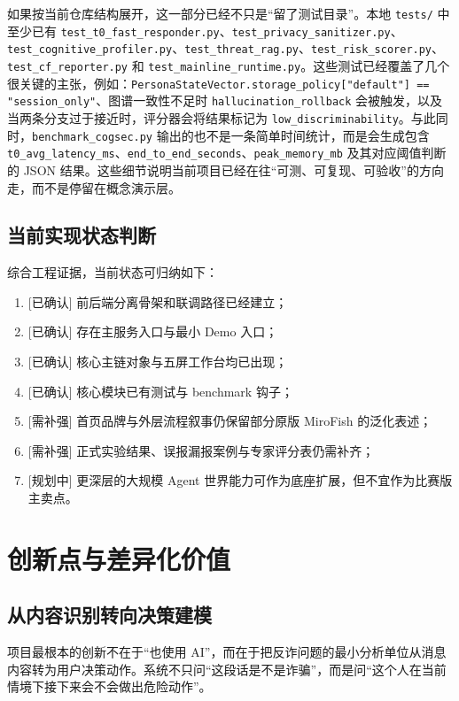 \documentclass[12pt,a4paper]{ctexart}
\newcommand{\StatusDone}{\textcolor{green!45!black}{[已确认]}}
\newcommand{\StatusPlan}{\textcolor{orange!80!black}{[规划中]}}
\newcommand{\StatusRisk}{\textcolor{red!70!black}{[需补强]}}
\begin{document}
如果按当前仓库结构展开，这一部分已经不只是“留了测试目录”。本地 \texttt{tests/} 中至少已有 \texttt{test\_t0\_fast\_responder.py}、\texttt{test\_privacy\_sanitizer.py}、\texttt{test\_cognitive\_profiler.py}、\texttt{test\_threat\_rag.py}、\texttt{test\_risk\_scorer.py}、\texttt{test\_cf\_reporter.py} 和 \texttt{test\_mainline\_runtime.py}。这些测试已经覆盖了几个很关键的主张，例如：\texttt{PersonaStateVector.storage\_policy["default"] == "session\_only"}、图谱一致性不足时 \texttt{hallucination\_rollback} 会被触发，以及当两条分支过于接近时，评分器会将结果标记为 \texttt{low\_discriminability}。与此同时，\texttt{benchmark\_cogsec.py} 输出的也不是一条简单时间统计，而是会生成包含 \texttt{t0\_avg\_latency\_ms}、\texttt{end\_to\_end\_seconds}、\texttt{peak\_memory\_mb} 及其对应阈值判断的 JSON 结果。这些细节说明当前项目已经在往“可测、可复现、可验收”的方向走，而不是停留在概念演示层。

\subsection{当前实现状态判断}

综合工程证据，当前状态可归纳如下：
\begin{enumerate}[leftmargin=2em]
  \item \StatusDone{} 前后端分离骨架和联调路径已经建立；
  \item \StatusDone{} 存在主服务入口与最小 Demo 入口；
  \item \StatusDone{} 核心主链对象与五屏工作台均已出现；
  \item \StatusDone{} 核心模块已有测试与 benchmark 钩子；
  \item \StatusRisk{} 首页品牌与外层流程叙事仍保留部分原版 MiroFish 的泛化表述；
  \item \StatusRisk{} 正式实验结果、误报漏报案例与专家评分表仍需补齐；
  \item \StatusPlan{} 更深层的大规模 Agent 世界能力可作为底座扩展，但不宜作为比赛版主卖点。
\end{enumerate}

\section{创新点与差异化价值}

\subsection{从内容识别转向决策建模}

项目最根本的创新不在于“也使用 AI”，而在于把反诈问题的最小分析单位从消息内容转为用户决策动作。系统不只问“这段话是不是诈骗”，而是问“这个人在当前情境下接下来会不会做出危险动作”。
\end{document}
